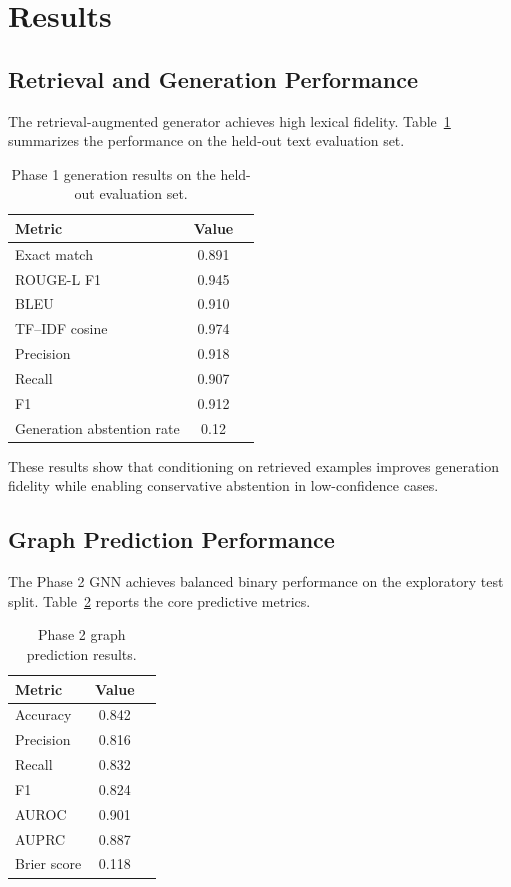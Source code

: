 \documentclass[conference]{IEEEtran}
\begin{document}
\section{Results}
\subsection{Retrieval and Generation Performance}
The retrieval-augmented generator achieves high lexical fidelity. Table~\ref{tab:gen_results} summarizes the performance on the held-out text evaluation set.

\begin{table}[t]
    \centering
    \caption{Phase 1 generation results on the held-out evaluation set.}
    \label{tab:gen_results}
    \begin{tabular}{@{}lcc@{}}
    \toprule
    Metric & Value \\
    \midrule
    Exact match & 0.891 \\
    ROUGE-L F1 & 0.945 \\
    BLEU & 0.910 \\
    TF--IDF cosine & 0.974 \\
    Precision & 0.918 \\
    Recall & 0.907 \\
    F1 & 0.912 \\
    Generation abstention rate & 0.12 \\
    \bottomrule
    \end{tabular}
\end{table}

These results show that conditioning on retrieved examples improves generation fidelity while enabling conservative abstention in low-confidence cases.

\subsection{Graph Prediction Performance}
The Phase 2 GNN achieves balanced binary performance on the exploratory test split. Table~\ref{tab:gnn_results} reports the core predictive metrics.

\begin{table}[t]
    \centering
    \caption{Phase 2 graph prediction results.}
    \label{tab:gnn_results}
    \begin{tabular}{@{}lcc@{}}
    \toprule
    Metric & Value \\
    \midrule
    Accuracy & 0.842 \\
    Precision & 0.816 \\
    Recall & 0.832 \\
    F1 & 0.824 \\
    AUROC & 0.901 \\
    AUPRC & 0.887 \\
    Brier score & 0.118 \\
    \bottomrule
    \end{tabular}
\end{table}
\end{document}
